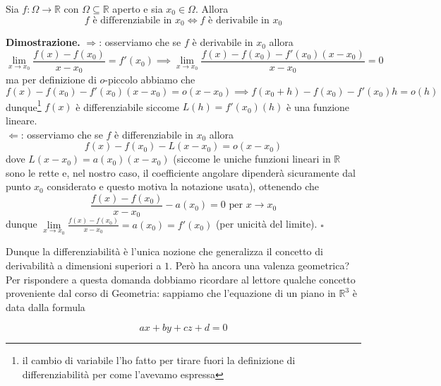 \vspace{0.5cm}
\begin{prop}[\textcolor{blue}{differenzialità $\iff$ derivabilità}]
Sia $f: \Omega \to \mathbb{R}$ con $\Omega \subseteq \mathbb{R}$ aperto e sia $x_0 \in \Omega$. Allora
$$
f \text{ è differenziabile in } x_0 \iff f \text{ è derivabile in }x_0
$$
\end{prop}

\noindent \textbf{Dimostrazione. }
$\boxed{\Rightarrow}$: osserviamo che se $f$ è derivabile in $x_0$ allora
$$
\lim_{x \to x_0} \frac{f(x)-f(x_0)}{x-x_0} = f'(x_0) \implies \lim_{x \to x_0} \frac{f(x) - f(x_0) - f'(x_0)(x-x_0)}{x-x_0} = 0
$$
ma per definizione di $o$-piccolo abbiamo che
$$
f(x)-f(x_0) - f'(x_0)(x-x_0) = o(x-x_0) \implies f(x_0 + h) - f(x_0) - f'(x_0)h = o(h)
$$
dunque\footnote{il cambio di variabile l'ho fatto per tirare fuori la definizione di differenziabilità per come l'avevamo espressa} $f(x)$ è differenziabile siccome $L(h)=f'(x_0)(h)$ è una funzione lineare. \\
$\boxed{\Leftarrow}$: osserviamo che se $f$ è differenziabile in $x_0$ allora
$$
f(x) - f(x_0) - L(x-x_0) = o(x-x_0)
$$
dove $L(x-x_0) = a(x_0)(x-x_0)$ (siccome le uniche funzioni lineari in $\mathbb{R}$ sono le rette e, nel nostro caso, il coefficiente angolare dipenderà sicuramente dal punto $x_0$ considerato e questo motiva la notazione usata), ottenendo che
$$
\frac{f(x)-f(x_0)}{x-x_0} - a(x_0) = 0 \text{ per } x \to x_0
$$
dunque $\lim\limits_{x \to x_0} \frac{f(x)-f(x_0)}{x-x_0} = a(x_0) = f'(x_0)$ (per unicità del limite).
\hfill $\square$

Dunque la differenziabilità è l'unica nozione che generalizza il concetto di derivabilità a dimensioni superiori a $1$. Però ha ancora una valenza geometrica? \\
Per rispondere a questa domanda dobbiamo ricordare al lettore qualche concetto proveniente dal corso di Geometria: sappiamo che l'equazione di un piano in $\mathbb{R}^3$ è data dalla formula

\begin{equation}
ax + by + cz + d = 0
\end{equation}

